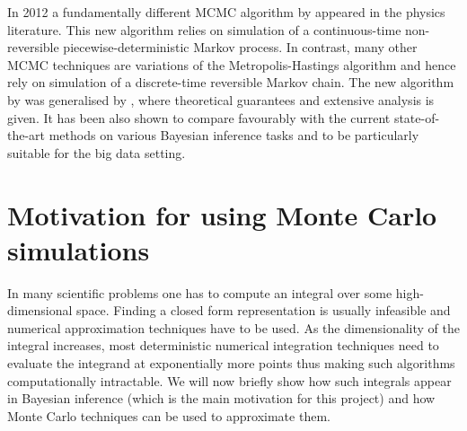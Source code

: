 \documentclass[report.tex]{subfiles}
\begin{document}
In 2012 a fundamentally different MCMC algorithm by \citet{peters2012rejection}
appeared in the physics literature. This new algorithm relies on simulation of
a continuous-time non-reversible piecewise-deterministic Markov process. In
contrast, many other MCMC techniques are variations of the
Metropolis-Hastings algorithm and hence rely on simulation of a discrete-time
reversible Markov chain. The new algorithm by \citet{peters2012rejection}
was generalised by \citet{bouchard2015bouncy},
where theoretical guarantees and extensive analysis is given.
It has been also shown to compare favourably with the current
state-of-the-art methods on various Bayesian inference tasks and to be
particularly suitable for the big data setting.


\section{Motivation for using Monte Carlo simulations}
\label{mcmc-motivation}

In many scientific problems one has to compute an integral over some
high-dimensional space.
Finding a closed form representation is usually infeasible and numerical
approximation techniques have to be used.
As the dimensionality of the integral increases, most deterministic
numerical integration techniques need to evaluate the integrand at exponentially
more points thus making such algorithms computationally intractable.
We will now briefly show how such integrals appear in Bayesian inference
(which is the main motivation for this project)
and how Monte Carlo techniques can be used to approximate
them.
\end{document}
